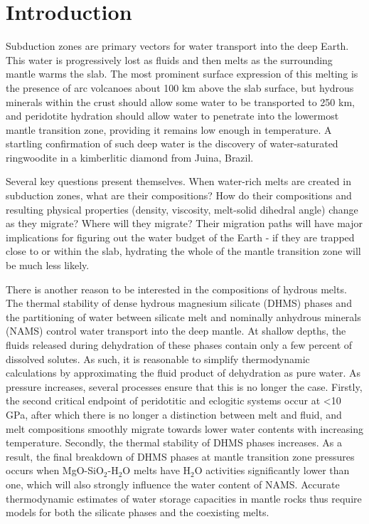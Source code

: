 \documentclass[review]{elsarticle}
\begin{document}
\linenumbers

\section{Introduction}
Subduction zones are primary vectors for water transport into the deep Earth. This water is progressively lost as fluids and then melts as the surrounding mantle warms the slab. The most prominent surface expression of this melting is the presence of arc volcanoes about 100 km above the slab surface, but hydrous minerals within the crust should allow some water to be transported to 250 km, and peridotite hydration should allow water to penetrate into the lowermost mantle transition zone, providing it remains low enough in temperature. A startling confirmation of such deep water is the discovery of water-saturated ringwoodite in a kimberlitic diamond from Juina, Brazil.

Several key questions present themselves. When water-rich melts are created in subduction zones, what are their compositions? How do their compositions and resulting physical properties (density, viscosity, melt-solid dihedral angle) change as they migrate? Where will they migrate? Their migration paths will have major implications for figuring out the water budget of the Earth - if they are trapped close to or within the slab, hydrating the whole of the mantle transition zone will be much less likely.

There is another reason to be interested in the compositions of hydrous melts. The thermal stability of dense hydrous magnesium silicate (DHMS) phases and the partitioning of water between silicate melt and nominally anhydrous minerals (NAMS) control water transport into the deep mantle. At shallow depths, the fluids released during dehydration of these phases contain only a few percent of dissolved solutes. As such, it is reasonable to simplify thermodynamic calculations by approximating the fluid product of dehydration as pure water. As pressure increases, several processes ensure that this is no longer the case. Firstly, the second critical endpoint of peridotitic and eclogitic systems occur at <10 GPa, after which there is no longer a distinction between melt and fluid, and melt compositions smoothly migrate towards lower water contents with increasing temperature. Secondly, the thermal stability of DHMS phases increases. As a result, the final breakdown of DHMS phases at mantle transition zone pressures occurs when MgO-SiO$_2$-H$_2$O melts have H$_2$O activities significantly lower than one, which will also strongly influence the water content of NAMS. Accurate thermodynamic estimates of water storage capacities in mantle rocks thus require models for both the silicate phases and the coexisting melts.
\end{document}
